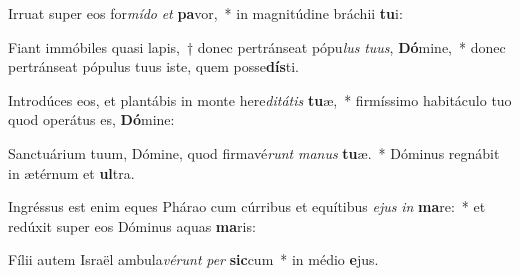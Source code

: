 \item Irruat super eos for\textit{mí}\textit{do} \textit{et} \textbf{pa}vor,~* in magnitúdine bráchii \textbf{tu}i:
\item Fiant immóbiles quasi lapis,~† donec pertránseat pópu\textit{lus} \textit{tu}\textit{us}, \textbf{Dó}mine,~* donec pertránseat pópulus tuus iste, quem posse\textbf{dís}ti.
\item Introdúces eos, et plantábis in monte here\textit{di}\textit{tá}\textit{tis} \textbf{tu}æ,~* firmíssimo habitáculo tuo quod operátus es, \textbf{Dó}mine:
\item Sanctuárium tuum, Dómine, quod firmavé\textit{runt} \textit{ma}\textit{nus} \textbf{tu}æ.~* Dóminus regnábit in ætérnum et \textbf{ul}tra.
\item Ingréssus est enim eques Phárao cum cúrribus et equítibus \textit{e}\textit{jus} \textit{in} \textbf{ma}re:~* et redúxit super eos Dóminus aquas \textbf{ma}ris:
\item Fílii autem Israël ambula\textit{vé}\textit{runt} \textit{per} \textbf{sic}cum~* in médio \textbf{e}jus.
